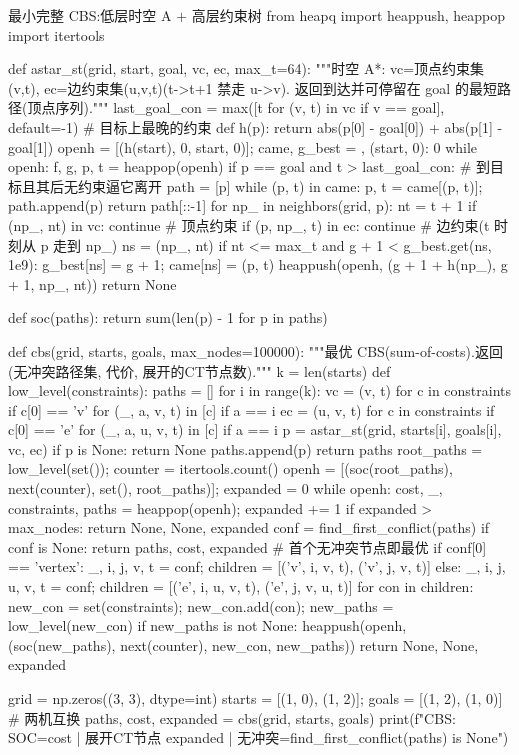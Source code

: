 \begin{codebox}[Python]{最小完整 CBS:低层时空 A\* $+$ 高层约束树}
from heapq import heappush, heappop
import itertools

def astar_st(grid, start, goal, vc, ec, max_t=64):
    """时空 A*: vc=顶点约束集{(v,t)}, ec=边约束集{(u,v,t)}(t->t+1 禁走 u->v).
    返回到达并可停留在 goal 的最短路径(顶点序列)."""
    last_goal_con = max([t for (v, t) in vc if v == goal], default=-1)   # 目标上最晚的约束
    def h(p): return abs(p[0] - goal[0]) + abs(p[1] - goal[1])
    openh = [(h(start), 0, start, 0)]; came, g_best = {}, {(start, 0): 0}
    while openh:
        f, g, p, t = heappop(openh)
        if p == goal and t > last_goal_con:                # 到目标且其后无约束逼它离开
            path = [p]
            while (p, t) in came: p, t = came[(p, t)]; path.append(p)
            return path[::-1]
        for np_ in neighbors(grid, p):
            nt = t + 1
            if (np_, nt) in vc: continue                   # 顶点约束
            if (p, np_, t) in ec: continue                 # 边约束(t 时刻从 p 走到 np_)
            ns = (np_, nt)
            if nt <= max_t and g + 1 < g_best.get(ns, 1e9):
                g_best[ns] = g + 1; came[ns] = (p, t)
                heappush(openh, (g + 1 + h(np_), g + 1, np_, nt))
    return None

def soc(paths): return sum(len(p) - 1 for p in paths)

def cbs(grid, starts, goals, max_nodes=100000):
    """最优 CBS(sum-of-costs).返回(无冲突路径集, 代价, 展开的CT节点数)."""
    k = len(starts)
    def low_level(constraints):
        paths = []
        for i in range(k):
            vc = {(v, t) for c in constraints if c[0] == 'v' for (_, a, v, t) in [c] if a == i}
            ec = {(u, v, t) for c in constraints if c[0] == 'e' for (_, a, u, v, t) in [c] if a == i}
            p = astar_st(grid, starts[i], goals[i], vc, ec)
            if p is None: return None
            paths.append(p)
        return paths
    root_paths = low_level(set()); counter = itertools.count()
    openh = [(soc(root_paths), next(counter), set(), root_paths)]; expanded = 0
    while openh:
        cost, _, constraints, paths = heappop(openh); expanded += 1
        if expanded > max_nodes: return None, None, expanded
        conf = find_first_conflict(paths)
        if conf is None: return paths, cost, expanded       # 首个无冲突节点即最优
        if conf[0] == 'vertex':
            _, i, j, v, t = conf; children = [('v', i, v, t), ('v', j, v, t)]
        else:
            _, i, j, u, v, t = conf; children = [('e', i, u, v, t), ('e', j, v, u, t)]
        for con in children:
            new_con = set(constraints); new_con.add(con); new_paths = low_level(new_con)
            if new_paths is not None:
                heappush(openh, (soc(new_paths), next(counter), new_con, new_paths))
    return None, None, expanded

grid = np.zeros((3, 3), dtype=int)
starts = [(1, 0), (1, 2)]; goals = [(1, 2), (1, 0)]         # 两机互换
paths, cost, expanded = cbs(grid, starts, goals)
print(f"CBS: SOC={cost} | 展开CT节点 {expanded} | 无冲突={find_first_conflict(paths) is None}")
\end{codebox}

